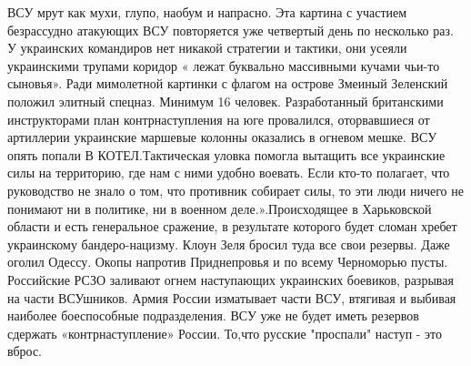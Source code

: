 ВСУ мрут как мухи, глупо, наобум и напрасно. Эта картина с участием безрассудно
атакующих ВСУ повторяется уже четвертый день по несколько раз. У украинских
командиров нет никакой стратегии и тактики, они усеяли украинскими трупами
коридор « лежат буквально массивными кучами чьи-то сыновья». Ради мимолетной
картинки с флагом на острове Змеиный Зеленский положил элитный спецназ. Минимум
16 человек. Разработанный британскими инструкторами план контрнаступления на
юге провалился, оторвавшиеся от артиллерии украинские маршевые колонны
оказались в огневом мешке. ВСУ опять попали В КОТЕЛ.Тактическая уловка помогла
вытащить все украинские силы на территорию, где нам с ними удобно воевать. Если
кто-то полагает, что руководство не знало о том, что противник собирает силы,
то эти люди ничего не понимают ни в политике, ни в военном деле.».Происходящее
в Харьковской области и есть генеральное сражение, в результате которого будет
сломан хребет украинскому бандеро-нацизму. Клоун Зеля бросил туда все свои
резервы. Даже оголил Одессу. Окопы напротив Приднепровья и по всему Черноморью
пусты. Российские РСЗО заливают огнем наступающих украинских боевиков, разрывая
на части ВСУшников. Армия России изматывает части ВСУ, втягивая и выбивая
наиболее боеспособные подразделения. ВСУ уже не будет иметь резервов сдержать
«контрнаступление» России. То,что русские "проспали" наступ - это вброс.











